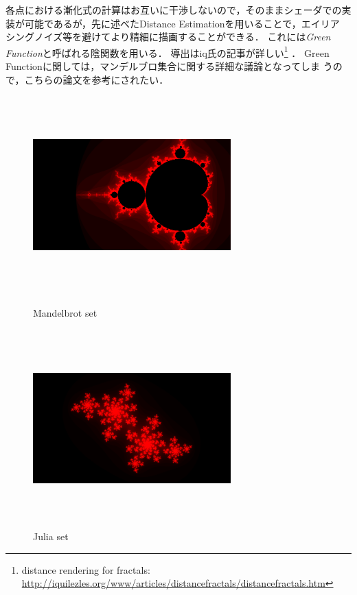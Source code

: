 各点における漸化式の計算はお互いに干渉しないので，そのままシェーダでの実
装が可能であるが，先に述べたDistance Estimationを用いることで，エイリア
シングノイズ等を避けてより精細に描画することができる．
これには{\it Green Function}と呼ばれる陰関数を用いる．
導出はiq氏の記事が詳しい\footnote{distance rendering for fractals:
\url{http://iquilezles.org/www/articles/distancefractals/distancefractals.htm}}
．
Green Functionに関しては，マンデルブロ集合に関する詳細な議論となってしま
うので，こちらの論文\cite{mandelbrot}を参考にされたい．

\begin{figure}[htbp]
 \begin{minipage}{0.49\hsize}
  \begin{center}
   \includegraphics[width=3in, height=3in, keepaspectratio]{../img/fractal/mandelbrot.pdf}
   \caption{Mandelbrot set}
   \label{fig:mandelbrot}
  \end{center}
 \end{minipage}
 \begin{minipage}{0.49\hsize}
     \includegraphics[width=3in, height=3in, keepaspectratio]{../img/fractal/julia.pdf}
   \caption{Julia set}
   \label{fig:julia}
 \end{minipage}
\end{figure}

